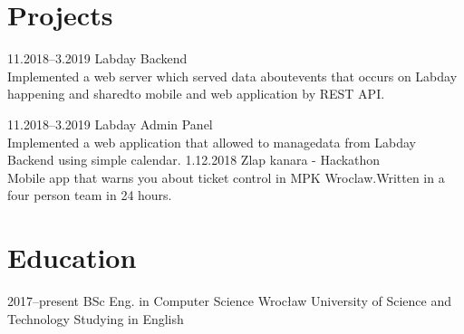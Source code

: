 \documentclass[]{cv-style}
\begin{document}
\section{Projects}

\begin{entrylist}
\entry
  {11.2018--3.2019}
  { Labday Backend}
  {}
  {\\
  Implemented a web server which served data about\newline events that occurs on Labday happening and shared\newline to mobile and web application by REST API.\newline}
  {\vspace{-0.05cm}}

\entry
  {11.2018--3.2019}
  { Labday Admin Panel}
  {}
  {\\
  Implemented a web application that allowed to manage\newline data from Labday Backend using simple calendar.\newline}
  {\vspace{-0.3cm}}
\entry
  { 1.12.2018}
  { Zlap kanara - Hackathon}
  {}
  {\\
  Mobile app that warns you about ticket control in MPK Wroclaw.\newline Written in a four person team in 24 hours.}
  {\vspace{-0.3cm}}
\end{entrylist}


\section{Education}

\begin{entrylist}
\entry
{2017--present\quad }
{ BSc Eng. {\normalfont  in Computer Science}}
{Wrocław University of Science and Technology}
{ Studying in English}
{\vspace{0.3cm}}
\end{entrylist}
\end{document}
